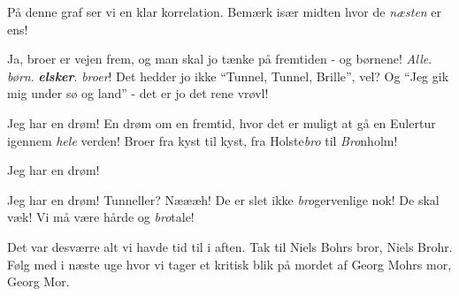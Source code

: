\documentclass[a4paper,11pt]{article}
\begin{document}
\begin{sketch}

    På denne graf ser vi en klar
    korrelation. Bemærk især midten hvor de \emph{næsten} er ens!

    Ja, broer er vejen frem, og man skal jo tænke på fremtiden - og børnene!
    \emph{Alle}. \emph{børn}. \emph{\bf elsker}. \emph{broer}!
    Det hedder jo ikke ``Tunnel, Tunnel, Brille'', vel?
    Og ``Jeg gik mig under sø og land'' - det er jo det rene vrøvl!

    Jeg har en drøm! En drøm om en fremtid, hvor det er muligt at gå en Eulertur igennem
    \emph{hele} verden! Broer fra kyst til kyst, fra Holste\emph{bro} til \emph{Bro}nholm!

    Jeg har en drøm!

    Jeg har en drøm!
    Tunneller? Næææh! De er slet ikke \emph{bro}gervenlige nok!
    De skal væk! Vi må være hårde og \emph{bro}tale!


 Det var desværre alt vi havde tid til i aften. Tak til Niels Bohrs bror, Niels Brohr.
         Følg med i næste uge hvor vi tager et kritisk blik på mordet af Georg Mohrs mor, Georg Mor.


\end{sketch}
\end{document}
